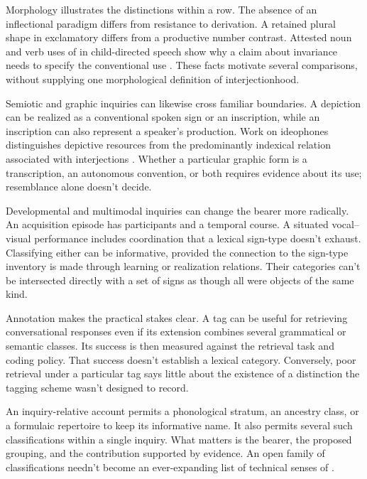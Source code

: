 \documentclass[12pt]{article}
\begin{document}
Morphology illustrates the distinctions within a row. The absence of an inflectional paradigm differs from resistance
to derivation. A retained plural shape in exclamatory 
differs from a productive number contrast. Attested noun and verb
uses of  in child-directed speech show why a claim
about invariance needs to specify the conventional use
\citep[36]{stange2016}. These facts motivate several comparisons,
without supplying one morphological definition of interjectionhood.

Semiotic and graphic inquiries can likewise cross familiar boundaries.
A depiction can be realized as a conventional spoken sign or an
inscription, while an inscription can also represent a speaker's
production. Work on ideophones distinguishes depictive resources
from the predominantly indexical relation associated with interjections
\citep{dingemanse2018,dingemanseakita2017}. Whether a particular graphic
form is a transcription, an autonomous convention, or both requires
evidence about its use; resemblance alone doesn't decide.

Developmental and multimodal inquiries can change the bearer more
radically. An acquisition episode has participants and a temporal
course. A situated vocal--visual performance includes coordination
that a lexical sign-type doesn't exhaust. Classifying either can
be informative, provided the connection to the sign-type inventory
is made through learning or realization relations. Their categories
can't be intersected directly with a set of signs as though all
were objects of the same kind.

Annotation makes the practical stakes clear. A tag can be useful
for retrieving conversational responses even if its extension combines
several grammatical or semantic classes. Its success is then measured
against the retrieval task and coding policy. That success doesn't
establish a lexical category. Conversely, poor retrieval under a
particular tag says little about the existence of a distinction
the tagging scheme wasn't designed to record.

An inquiry-relative
account permits a phonological stratum, an ancestry class, or a
formulaic repertoire to keep its informative name. It also permits
several such classifications within a single inquiry. What matters
is the bearer, the proposed grouping, and the contribution supported
by evidence. An open family of classifications needn't become an
ever-expanding list of technical senses of .
\end{document}
